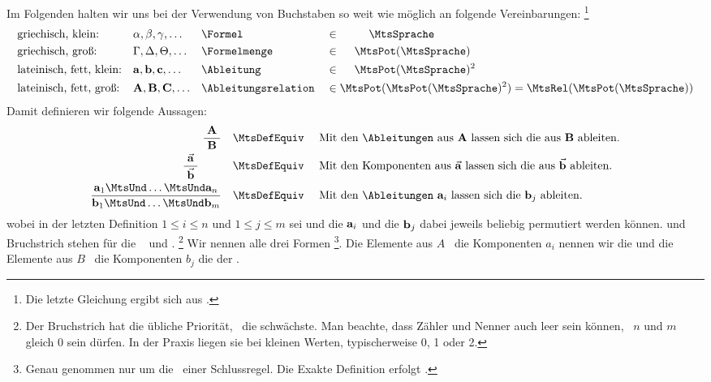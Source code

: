 %
Im Folgenden halten wir uns bei der Verwendung von Buchstaben so weit wie möglich an folgende Vereinbarungen:%
\footnote{Die letzte Gleichung ergibt sich aus .}
\begin{align}
	&  \text{griechisch, klein:}       && \alpha, \beta, \gamma, \dots
	&& \text{\Formel}                  && \in \qquad \; \; \MtsSprache
	\\
	&  \text{griechisch, groß:}        && \Gamma, \Delta, \Theta, \dots
	&& \text{\Formelmenge}             && \in \quad \; \MtsPotSprache
	\\
	&  \text{lateinisch, fett, klein:} && \drvFt{a}, \drvFt{b}, \drvFt{c}, \dots
	&& \text{\Ableitung}               && \in \quad \; \MtsAllDerive
	\\
	&  \text{lateinisch, fett, groß:}  && \DrvFt{A}, \DrvFt{B}, \DrvFt{C}, \dots
	&& \text{\Ableitungsrelation}      && \in \MtsPotAllDerive = \MtsRelAllDerive
\end{align}
Damit definieren wir folgende Aussagen:
\begin{align}
	\frac{\; \DrvFt{A}  \;}{\; \DrvFt{B} \;}
	& \quad \MtsDefEquiv \quad
	\text{ Mit den \Ableitungen\ aus $\DrvFt{A}$ lassen sich die aus $\DrvFt{B}$ ableiten.}
	\label{def:AB}
	\\
	\frac{\; \vec{\drvFt{a}} \;}{\; \vec{\drvFt{b}} \;} \qquad
	& \quad \MtsDefEquiv \quad
	\text{ Mit den Komponenten aus $\vec{\drvFt{a}}$ lassen sich die aus $\vec{\drvFt{b}}$ ableiten.}
	\label{def:ab}
	\\
	\frac{\drvFt{a}_1 \MtsUnd \dots \MtsUnd \drvFt{a}_n}{\drvFt{b}_1 \MtsUnd \dots \MtsUnd \drvFt{b}_m}
	& \quad \MtsDefEquiv \quad
	\text{ Mit den \Ableitungen\ $\drvFt{a}_i$ lassen sich die $\drvFt{b}_j$ ableiten.}
	\label{def:aabb}
\end{align}
wobei in der letzten Definition $1 \le i \le n$ und $1 \le j \le m$ sei und die $\mathbf{a}_i$ und die $\mathbf{b}_j$ dabei jeweils beliebig permutiert werden können.
 und Bruchstrich stehen für die \Metaoperationen\ \chrqt{\MtsAnd} und \chrqt{\MtsImp}.%
\footnote{%
	Der Bruchstrich hat die übliche Priorität, \MtsUnd\ die schwächste.
	Man beachte, dass Zähler und Nenner auch leer sein können, \textdh\ $n$ und $m$ gleich $0$ sein dürfen.
	In der Praxis liegen sie bei kleinen Werten, typischerweise 0, 1 oder 2.
}
Wir nennen alle drei Formen %
\footnote{%
	Genau genommen nur um die \Darstellung\ einer Schlussregel.
	Die Exakte Definition erfolgt .
}.
Die Elemente aus $A$ \textbzw\ die Komponenten $a_i$ nennen wir die  und die Elemente aus $B$ \textbzw\ die Komponenten $b_j$ die  der \Schlussregel.
